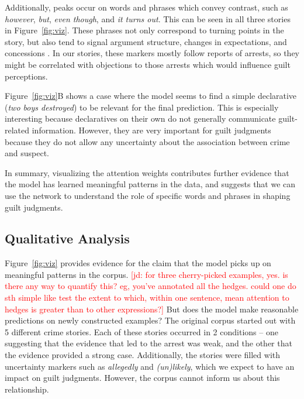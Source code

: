\documentclass[11pt,a4paper]{article}
\newcommand{\word}[1]{\emph{#1}}
\newcommand{\jd}[1]{\textcolor{Red}{[jd: #1]}}
\begin{document}
Additionally, peaks occur on words and phrases which convey contrast, such as \word{however}, \word{but}, \word{even though}, and \word{it turns out}. This can be seen in all three stories in Figure~\ref{fig:viz}. These phrases not only correspond to turning points in the story, but also tend to signal argument structure, changes in expectations, and concessions \citep{RLakoff:1971,Merin:1999,Blakemore01}. In our stories, these markers mostly follow reports of arrests, so they might be correlated with objections to those arrests which would influence guilt perceptions.

Figure~\ref{fig:viz}B shows a case where the model seems to find a simple declarative (\word{two boys destroyed}) to be relevant for the final prediction. This is especially interesting because declaratives on their own do not generally communicate guilt-related information. However, they are very important for guilt judgments because they do not allow any uncertainty about the association between crime and suspect.

In summary, visualizing the attention weights contributes further evidence that the model has learned meaningful patterns in the data, and suggests that we can use the network to understand the role of specific words and phrases in shaping guilt judgments.


\subsection{Qualitative Analysis}

Figure~\ref{fig:viz} provides evidence for the claim that the model picks up on meaningful patterns in the corpus. \jd{for three cherry-picked examples, yes. is there any way to quantify this? eg, you've annotated all the hedges. could one do sth simple like test the extent to which, within one sentence, mean attention to hedges is greater than to other expressions?} But does the model make reasonable predictions on newly constructed examples?  The original corpus started out with 5 different crime stories. Each of these stories occurred in 2 conditions -- one suggesting that the evidence that led to the arrest was weak, and the other that the evidence provided a strong case. Additionally, the stories were filled with uncertainty markers such as \word{allegedly} and \word{(un)likely}, which we expect to have an impact on guilt judgments. However, the corpus cannot inform us about this relationship.
\end{document}
